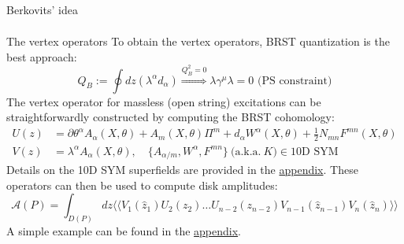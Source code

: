 \documentclass{beamer}
\begin{document}
\begin{frame}[allowframebreaks]{Berkovits' idea}
\begin{equation*}
\begin{gathered}
		\end{gathered}
	\end{equation*}
\end{frame}
\begin{frame}{The vertex operators}
	To obtain the vertex operators, BRST quantization is the best approach:
	\begin{equation*}
		Q_B:=\oint dz(\lambda^\alpha d_\alpha) \overset{Q_B^2=0}{\Longrightarrow}\lambda\gamma^\mu\lambda = 0 \text{  (PS constraint)}
	\end{equation*}
	The vertex operator for massless (open string) excitations can be straightforwardly constructed by computing the BRST cohomology:
	\begin{equation*}
		\begin{aligned}
			U(z)&=\partial\theta^\alpha A_\alpha(X,\theta)+A_m(X,\theta)\Pi^m+d_\alpha W^\alpha(X,\theta)+\frac{1}{2}N_{mn}F^{mn}(X,\theta)\\
			V(z)&=\lambda^\alpha A_\alpha(X,\theta),\quad\{A_{\alpha/m},W^\alpha,F^{mn}\}\mathrm{~(a.k.a.~}K)\in10\text{D SYM}
		\end{aligned}
	\end{equation*}
	Details on the 10D SYM superfields are provided in the  \hyperlink{10d sym}{\color{blue} appendix}. These operators can then be used to compute disk amplitudes:
	\begin{equation}\label{disk}
		\mathcal{A}(P)=\int_{D(P)}dz\langle\langle V_1(\hat z_1)U_2(z_2)\ldots U_{n-2}(z_{n-2})V_{n-1}(\hat z_{n-1})V_n(\hat z_n)\rangle\rangle
	\end{equation}
	A simple example can be found in the \hyperlink{3-pt}{\color{blue} appendix}.
\end{frame}
\end{document}
